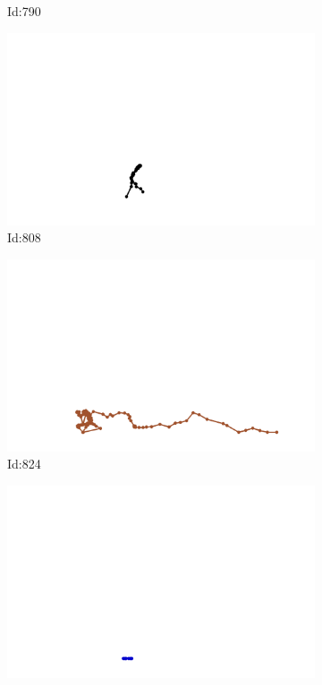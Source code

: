 \documentclass[12pt,twoside]{report}
\begin{document}
\begin{figure}
\begin{subfigure}[b]{0.20\textwidth}
\caption{Id:790}
\end{subfigure}
\begin{subfigure}[b]{0.20\textwidth}
\centering
\includegraphics[width=\textwidth]{../trajectories/808.png}
\caption{Id:808}
\end{subfigure}
\begin{subfigure}[b]{0.20\textwidth}
\centering
\includegraphics[width=\textwidth]{../trajectories/824.png}
\caption{Id:824}
\end{subfigure}
\begin{subfigure}[b]{0.20\textwidth}
\centering
\includegraphics[width=\textwidth]{../trajectories/833.png}

\end{subfigure}
\end{figure}
\end{document}
